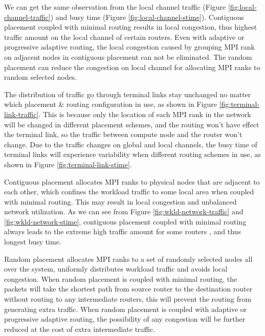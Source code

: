 \documentclass[conference,compsoc]{IEEEtran}
\newcommand{\NOTE}[1]{\hl {NOTE: #1}}
\begin{document}

We can get the same observation from the local channel traffic (Figure \ref{fig:local-channel-traffic}) and busy time (Figure \ref{fig:local-channel-stime}). Contiguous placement coupled with minimal routing results in local congestion, thus highest traffic amount on the local channel of certain routers. Even with adaptive or progressive adaptive routing, the local congestion caused by grouping MPI rank on adjacent nodes in contiguous placement can not be eliminated. The random placement can reduce the congestion on local channel for allocating MPI ranks to random selected nodes. 

The distribution of traffic go through terminal links stay unchanged no matter which placement \& routing configuration in use, as shown in Figure \ref{fig:terminal-link-traffic}. This is because only the location of each MPI rank in the network will be changed in different placement schemes, and the routing won't have effect the terminal link, so the traffic between compute node and the router won't change. Due to the traffic changes on global and local channels, the busy time of terminal links will experience variability when different routing schemes in use, as shown in Figure \ref{fig:terminal-link-stime}. 


 

Contiguous placement allocates MPI ranks to physical nodes that are adjacent to each other, which confines the workload traffic to some local area when coupled with minimal routing. This may result in local congestion and unbalanced network utilization. As we can see from Figure \ref{fig:wkld-network-traffic} and \ref{fig:wkld-network-stime}, contiguous placement coupled with minimal routing always leads to the extreme high traffic amount for some routers , and thus longest busy time.

Random placement allocates MPI ranks to a set of randomly selected nodes all over the system, uniformly distributes workload traffic and avoids local congestion. When random placement is coupled with minimal routing, the packets will take the shortest path from source router to the destination router without routing to any intermediate routers, this will prevent the routing from generating extra traffic. When random placement is coupled with adaptive or progressive adaptive routing, the possibility of any congestion will be further reduced at the cost of extra intermediate traffic. 
\end{document}
